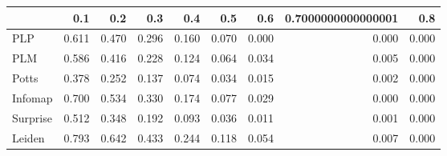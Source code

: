 \begin{tabular}{lrrrrrrrr}
\toprule
{} &   0.1 &   0.2 &   0.3 &   0.4 &   0.5 &   0.6 & 0.7000000000000001 &   0.8 \\
\midrule
PLP      & 0.611 & 0.470 & 0.296 & 0.160 & 0.070 & 0.000 &              0.000 & 0.000 \\
PLM      & 0.586 & 0.416 & 0.228 & 0.124 & 0.064 & 0.034 &              0.005 & 0.000 \\
Potts    & 0.378 & 0.252 & 0.137 & 0.074 & 0.034 & 0.015 &              0.002 & 0.000 \\
Infomap  & 0.700 & 0.534 & 0.330 & 0.174 & 0.077 & 0.029 &              0.000 & 0.000 \\
Surprise & 0.512 & 0.348 & 0.192 & 0.093 & 0.036 & 0.011 &              0.001 & 0.000 \\
Leiden   & 0.793 & 0.642 & 0.433 & 0.244 & 0.118 & 0.054 &              0.007 & 0.000 \\
\bottomrule
\end{tabular}
